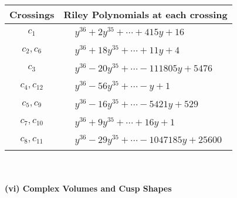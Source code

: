 \documentclass[1p]{elsarticle_modified}
\theoremstyle{definition}
\begin{document}
\begin{tabular}{m{50pt}|m{274pt}}
Crossings & \hspace{64pt}Riley Polynomials at each crossing \\
\hline $$\begin{aligned}c_{1}\end{aligned}$$&$\begin{aligned}
&y^{36}+2 y^{35}+\cdots+415 y+16
\end{aligned}$\\
\hline $$\begin{aligned}c_{2},c_{6}\end{aligned}$$&$\begin{aligned}
&y^{36}+18 y^{35}+\cdots+11 y+4
\end{aligned}$\\
\hline $$\begin{aligned}c_{3}\end{aligned}$$&$\begin{aligned}
&y^{36}-20 y^{35}+\cdots-111805 y+5476
\end{aligned}$\\
\hline $$\begin{aligned}c_{4},c_{12}\end{aligned}$$&$\begin{aligned}
&y^{36}-56 y^{35}+\cdots- y+1
\end{aligned}$\\
\hline $$\begin{aligned}c_{5},c_{9}\end{aligned}$$&$\begin{aligned}
&y^{36}-16 y^{35}+\cdots-5421 y+529
\end{aligned}$\\
\hline $$\begin{aligned}c_{7},c_{10}\end{aligned}$$&$\begin{aligned}
&y^{36}+9 y^{35}+\cdots+16 y+1
\end{aligned}$\\
\hline $$\begin{aligned}c_{8},c_{11}\end{aligned}$$&$\begin{aligned}
&y^{36}-29 y^{35}+\cdots-1047185 y+25600
\end{aligned}$\\
\hline
\end{tabular}\\~\\
\newpage\flushleft \textbf{(vi) Complex Volumes and Cusp Shapes}
\end{document}
